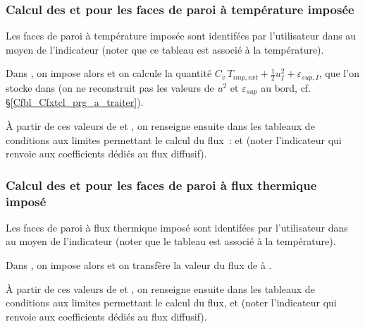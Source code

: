 \subsubsection*{Calcul des  et  pour les faces de paroi
\`a temp\'erature impos\'ee}

Les  faces de paroi   \`a temp\'erature impos\'ee sont identif\'ees par
l'utilisateur dans  au moyen de  l'indicateur
 (noter que
ce tableau est associ\'e \`a la temp\'erature).

Dans , on impose alors  et
on calcule la quantit\'e
$C_v\,T_{imp,ext}+\frac{1}{2}u^2_{I}+\varepsilon_{sup,I}$, que l'on
stocke dans  (on ne reconstruit pas les
valeurs de $u^2$ et $\varepsilon_{sup}$ au bord, cf. \S\ref{Cfbl_Cfxtcl_prg_a_traiter}).

\`A partir de ces valeurs de  et ,
on renseigne ensuite dans 
les tableaux de conditions aux limites  permettant le calcul du flux~:
 et
 (noter
l'indicateur  qui renvoie aux coefficients d\'edi\'es au flux
diffusif).


\subsubsection*{Calcul des  et  pour les faces de paroi
\`a flux thermique impos\'e}

Les  faces de paroi   \`a flux thermique
impos\'e sont identif\'ees par
l'utilisateur dans  au moyen de  l'indicateur
 (noter que le tableau est
associ\'e \`a la temp\'erature).

Dans , on impose alors  et
on transf\`ere la valeur du flux de  
\`a .

\`A partir de ces valeurs de  et ,
on renseigne ensuite dans  les tableaux de conditions aux limites
permettant le calcul du flux,
 et
 (noter
l'indicateur  qui renvoie aux coefficients d\'edi\'es au flux
diffusif).

